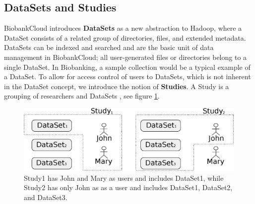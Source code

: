 \subsection*{DataSets and Studies}
BiobankCloud introduces \textbf{DataSets} as a new abstraction to Hadoop, where a DataSet consists of a related group of directories, files, and extended metadata. DataSets can be indexed and searched and are the basic unit of data management in BiobankCloud; all user-generated files or directories belong to a single DataSet. In Biobanking, a sample collection would be a typical example of a DataSet.  To allow for access control of users to DataSets, which is not inherent in the DataSet concept, we introduce the notion of \textbf{Studies}. A Study is a grouping of researchers and DataSets , see figure \ref{fig:studies}. 
\vspace{-5mm}
\begin{figure}[h]
 \centering
 \includegraphics[scale=0.4]{./imgs/projects-as-groupings1.eps}
\caption{Study1 has John and Mary as users and includes DataSet1, while Study2 has only John as as a user and includes DataSet1, DataSet2, and DataSet3.}
\label{fig:studies}
\end{figure}
\vspace{-5mm}
